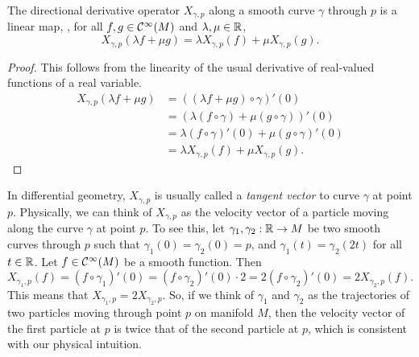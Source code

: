 \begin{proposition}
	The directional derivative operator \(X_{\gamma, p}\) along a smooth curve \(\gamma\) through \(p\) is a linear map, \ie, for all \(f, g \in \mathcal C^\infty(M)\) and \(\lambda, \mu \in \mathbb R\),
	\begin{equation}
		X_{\gamma, p}(\lambda f + \mu g) = \lambda X_{\gamma, p}(f) + \mu X_{\gamma, p}(g).
	\end{equation}
\end{proposition}
\begin{proof}
	This follows from the linearity of the usual derivative of real-valued functions of a real variable.
	\begin{align*}
		X_{\gamma, p}(\lambda f + \mu g) & = ((\lambda f + \mu g) \circ \gamma)'(0)                  \\
		                                 & = (\lambda (f \circ \gamma) + \mu (g \circ \gamma))'(0)   \\
		                                 & = \lambda (f \circ \gamma)'(0) + \mu (g \circ \gamma)'(0) \\
		                                 & = \lambda X_{\gamma, p}(f) + \mu X_{\gamma, p}(g).
	\end{align*}
\end{proof}
In differential geometry, \(X_{\gamma, p}\) is usually called a \emph{tangent vector} to curve \(\gamma\) at point \(p\). Physically, we can think of \(X_{\gamma, p}\) as the velocity vector of a particle moving along the curve \(\gamma\) at point \(p\). To see this, let \(\gamma_1, \gamma_2: \mathbb R \to M\) be two smooth curves through \(p\) such that \(\gamma_1(0) = \gamma_2(0) = p\), and \(\gamma_1(t) = \gamma_2(2 t)\) for all \(t \in \mathbb R\). Let \(f \in \mathcal C^\infty(M)\) be a smooth function. Then
\begin{equation}
	X_{\gamma_1, p}(f) = (f \circ \gamma_1)'(0) = (f \circ \gamma_2)'(0) \cdot 2 = 2 (f \circ \gamma_2)'(0) = 2 X_{\gamma_2, p}(f).
\end{equation}
This means that \(X_{\gamma_1, p} = 2 X_{\gamma_2, p}\). So, if we think of \(\gamma_1\) and \(\gamma_2\) as the trajectories of two particles moving through point \(p\) on manifold \(M\), then the velocity vector of the first particle at \(p\) is twice that of the second particle at \(p\), which is consistent with our physical intuition.

